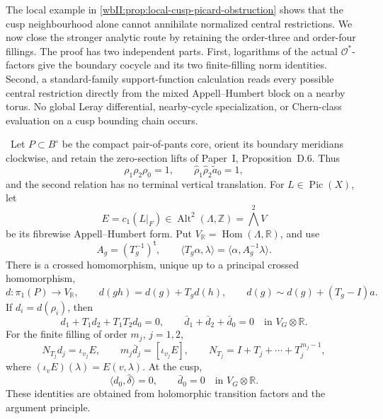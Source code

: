 The local example in \cref{wbII:prop:local-cusp-picard-obstruction} shows that
the cusp neighbourhood alone cannot annihilate normalized central
restrictions.  We now close the stronger analytic route by retaining the
order-three and order-four fillings.  The proof has two independent parts.
First, logarithms of the actual \(\mathcal O^*\)-factors give the boundary
cocycle and its two finite-filling norm identities.  Second, a
standard-family support-function calculation reads every possible
central restriction directly from the mixed Appell--Humbert block on a
nearby torus.  No global Leray differential, nearby-cycle specialization,
or Chern-class evaluation on a cusp bounding chain occurs.

\begin{proposition}
\label{wbII:prop:analytic-ah-boundary}
\ Let \(P\subset B^\circ\) be the compact pair-of-pants core,
orient its boundary meridians clockwise, and retain the zero-section lifts
of Paper~I, Proposition~D.6.  Thus
\[
 \rho_1\rho_2\rho_0=1,
 \qquad
 \widehat\rho_1\widehat\rho_2\widetilde a_0=1,
\tag{W.93}\label{wbII:eq:W:5.17-A1}
\]
and the second relation has no terminal vertical translation.  For
\(L\in\operatorname{Pic}(X)\), let
\[
 E=c_1(L|_F)\in\operatorname{Alt}^2(\Lambda,\mathbb Z)
   =\bigwedge^2V
\]
be its fibrewise Appell--Humbert form.  Put
\(V_{\mathbb R}=\operatorname{Hom}(\Lambda,\mathbb R)\), and use
\[
 A_g=(T_g^{-1})^{\mathsf t},
 \qquad
 \langle T_g\alpha,\lambda\rangle
 =\langle\alpha,A_g^{-1}\lambda\rangle.
\tag{W.94}\label{wbII:eq:W:5.17-A2}
\]
There is a crossed homomorphism, unique up to a principal crossed
homomorphism,
\[
 d:\pi_1(P)\longrightarrow V_{\mathbb R},
 \qquad
 d(gh)=d(g)+T_gd(h),
 \qquad
 d(g)\sim d(g)+(T_g-I)a.
\tag{W.95}\label{wbII:eq:W:5.17-A3}
\]
If \(d_i=d(\rho_i)\), then
\[
 d_1+T_1d_2+T_1T_2d_0=0,
 \qquad
 \bar d_1+\bar d_2+\bar d_0=0
 \quad\text{in }V_G\otimes\mathbb R.
\tag{W.96}\label{wbII:eq:W:5.17-A4}
\]
For the finite filling of order \(m_j\), \(j=1,2\),
\[
 N_{T_j}d_j=\iota_{v_j}E,
 \qquad
 m_j\bar d_j=[\iota_{v_j}E],
 \qquad
 N_{T_j}=I+T_j+\cdots+T_j^{m_j-1},
\tag{W.97}\label{wbII:eq:W:5.17-A5}
\]
where \((\iota_vE)(\lambda)=E(v,\lambda)\).  At the cusp,
\[
 \langle d_0,\widehat\delta\rangle=0,
 \qquad
 \bar d_0=0\quad\text{in }V_G\otimes\mathbb R.
\tag{W.98}\label{wbII:eq:W:5.17-A6}
\]
These identities are obtained from holomorphic transition factors and the
argument principle.
\end{proposition}

